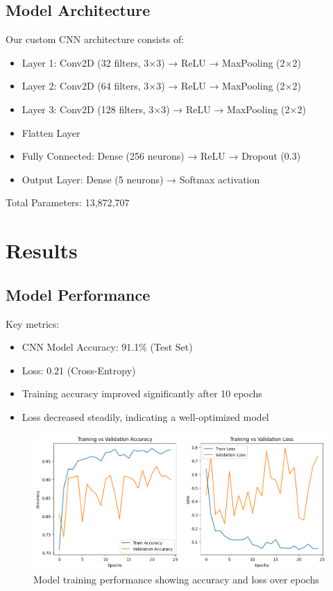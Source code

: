 \documentclass[twocolumn]{article}
\begin{document}
\subsection{Model Architecture}
Our custom CNN architecture consists of:
\begin{itemize}\itemsep4pt
    \item Layer 1: Conv2D (32 filters, 3×3) → ReLU → MaxPooling (2×2)
    \item Layer 2: Conv2D (64 filters, 3×3) → ReLU → MaxPooling (2×2)
    \item Layer 3: Conv2D (128 filters, 3×3) → ReLU → MaxPooling (2×2)
    \item Flatten Layer
    \item Fully Connected: Dense (256 neurons) → ReLU → Dropout (0.3)
    \item Output Layer: Dense (5 neurons) → Softmax activation
\end{itemize}

Total Parameters: 13,872,707

\section{Results}
\subsection{Model Performance}
Key metrics:
\begin{itemize}\itemsep4pt
    \item CNN Model Accuracy: 91.1\% (Test Set)
    \item Loss: 0.21 (Cross-Entropy)
    \item Training accuracy improved significantly after 10 epochs
    \item Loss decreased steadily, indicating a well-optimized model
\end{itemize}

\begin{figure}[H]
    \centering
    \includegraphics[width=\columnwidth]{AIML}
    \caption{Model training performance showing accuracy and loss over epochs}
    \label{fig:performance}
\end{figure}
\end{document}
